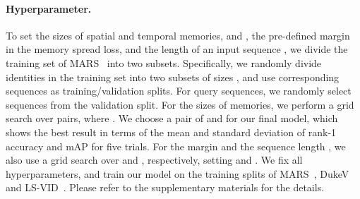 \documentclass[10pt,twocolumn,letterpaper]{article}
\begin{document}
		
		\vspace{-0.4cm}		
		\paragraph{Hyperparameter.}
		
			To set the sizes of spatial and temporal memories,  and , the pre-defined margin  in the memory spread loss, and the length of an input sequence , we divide the training set of MARS~\cite{zheng2016mars} into two subsets. Specifically, we randomly divide identities in the training set into two subsets of sizes , and use corresponding  sequences as training/validation splits. For query sequences, we randomly select  sequences from the validation split. For the sizes of memories, we perform a grid search over  pairs, where . We choose a pair of  and  for our final model, which shows the best result in terms of the mean and standard deviation of rank-1 accuracy and mAP for five trials. For the margin  and the sequence length , we also use a grid search over  and , respectively, setting  and . We fix all hyperparameters, and train our model on the training splits of MARS~\cite{zheng2016mars}, DukeV~\cite{wu2018exploit} and LS-VID~\cite{li2019global}. Please refer to the supplementary materials for the details.
		
\end{document}
